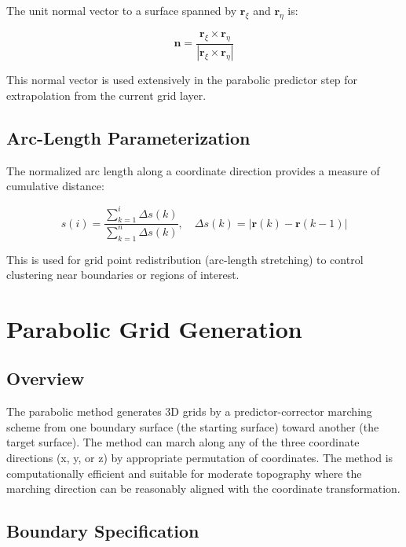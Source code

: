 \documentclass[11pt,a4paper]{report}
\newcommand{\rvec}{\bm{r}}
\newcommand{\nvec}{\bm{n}}
\begin{document}
The unit normal vector to a surface spanned by $\rvec_\xi$ and $\rvec_\eta$ is:

\begin{equation}
    \nvec = \frac{\rvec_\xi \times \rvec_\eta}{|\rvec_\xi \times \rvec_\eta|}
\end{equation}

This normal vector is used extensively in the parabolic predictor step for extrapolation from the current grid layer.

\section{Arc-Length Parameterization}

The normalized arc length along a coordinate direction provides a measure of cumulative distance:

\begin{equation}
    s(i) = \frac{\sum_{k=1}^{i} \Delta s(k)}{\sum_{k=1}^{n} \Delta s(k)}, \quad
    \Delta s(k) = |\rvec(k) - \rvec(k-1)|
\end{equation}

This is used for grid point redistribution (arc-length stretching) to control clustering near boundaries or regions of interest.

\chapter{Parabolic Grid Generation}

\section{Overview}

The parabolic method generates 3D grids by a predictor-corrector marching scheme from one boundary surface (the starting surface) toward another (the target surface). The method can march along any of the three coordinate directions (x, y, or z) by appropriate permutation of coordinates. The method is computationally efficient and suitable for moderate topography where the marching direction can be reasonably aligned with the coordinate transformation.

\section{Boundary Specification}
\end{document}
